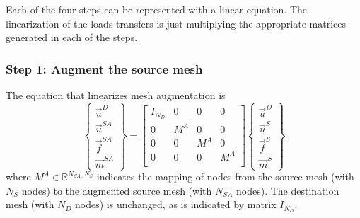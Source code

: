\documentclass[10pt,letterpaper,oneside,notitlepage]{article}
\begin{document}
Each of the four steps can be represented with a linear equation. The linearization of the loads transfers is just multiplying the 
appropriate matrices generated in each of the steps.


\subsubsection{Step 1: Augment the source mesh}
The equation that linearizes mesh augmentation is
\begin{equation}
\label{Augment}
	\left\{	\begin{matrix} \vec{u}^D \\ \vec{u}^{SA} \\ \vec{f}^{SA} \\ \vec{m}^{SA} \end{matrix} \right\} 
=
	\begin{bmatrix}
	I_{\mathit{N_D}} & 0   & 0   & 0   \\
	0 							 & M^A & 0   & 0   \\
	0 							 & 0   & M^A & 0   \\
	0								 & 0   & 0   & M^A \\
	\end{bmatrix}
	\left\{	\begin{matrix} \vec{u}^D \\ \vec{u}^S \\ \vec{f}^S \\ \vec{m}^S \end{matrix} \right\} 
\end{equation}
where $M^A \in \mathbb{R}^{ \mathit{N_{SA}},\mathit{N_{S}}}$ indicates the mapping of nodes from the source mesh (with $N_S$ nodes) to the augmented source mesh
(with $N_{SA}$ nodes). The destination mesh (with $N_D$ nodes) is unchanged, as is indicated by matrix $I_{\mathit{N_D}}$.
\end{document}
